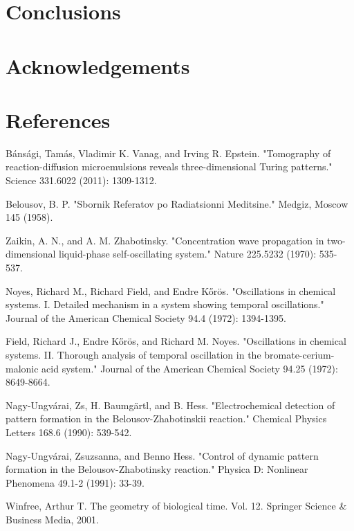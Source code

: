 \documentclass[3p, twocolumn]{elsarticle}
\begin{document}
\section{Conclusions}

\section*{Acknowledgements}

\section*{References}

\begin{thebibliography}{5}
Bánsági, Tamás, Vladimir K. Vanag, and Irving R. Epstein. "Tomography of reaction-diffusion microemulsions reveals three-dimensional Turing patterns." Science 331.6022 (2011): 1309-1312.

Belousov, B. P. "Sbornik Referatov po Radiatsionni Meditsine." Medgiz, Moscow 145 (1958).

Zaikin, A. N., and A. M. Zhabotinsky. "Concentration wave propagation in two-dimensional liquid-phase self-oscillating system." Nature 225.5232 (1970): 535-537.

Noyes, Richard M., Richard Field, and Endre Kőrös. "Oscillations in chemical systems. I. Detailed mechanism in a system showing temporal oscillations." Journal of the American Chemical Society 94.4 (1972): 1394-1395.

Field, Richard J., Endre Kőrös, and Richard M. Noyes. "Oscillations in chemical systems. II. Thorough analysis of temporal oscillation in the bromate-cerium-malonic acid system." Journal of the American Chemical Society 94.25 (1972): 8649-8664.


Nagy-Ungvárai, Zs, H. Baumgärtl, and B. Hess. "Electrochemical detection of pattern formation in the Belousov-Zhabotinskii reaction." Chemical Physics Letters 168.6 (1990): 539-542. 

Nagy-Ungvárai, Zsuzsanna, and Benno Hess. "Control of dynamic pattern formation in the Belousov-Zhabotinsky reaction." Physica D: Nonlinear Phenomena 49.1-2 (1991): 33-39.

 Winfree, Arthur T. The geometry of biological time. Vol. 12. Springer Science \& Business Media, 2001.

\end{thebibliography}
\end{document}
